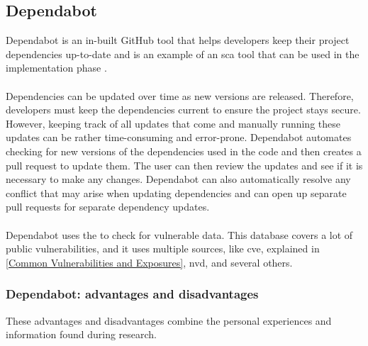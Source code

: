 \subsection{Dependabot}
Dependabot is an in-built GitHub tool that helps developers keep their project dependencies up-to-date and is an example of an \acrshort{sca} tool that can be used in the implementation phase \cite{GithubDependabot1}.
\\~\\
Dependencies can be updated over time as new versions are released. Therefore, developers must keep the dependencies current to ensure the project stays secure. However, keeping track of all updates that come and manually running these updates can be rather time-consuming and error-prone. Dependabot automates checking for new versions of the dependencies used in the code and then creates a pull request to update them. The user can then review the updates and see if it is necessary to make any changes. 
Dependabot can also automatically resolve any conflict that may arise when updating dependencies and can open up separate pull requests for separate dependency updates. 
\\~\\
Dependabot uses the  to check for vulnerable data. This database covers a lot of public vulnerabilities, and it uses multiple sources, like \acrlong{cve}, explained in \ref{Common Vulnerabilities and Exposures}, \acrlong{nvd}, and several others. \cite{GithubDependabot2}


\subsubsection{Dependabot: advantages and disadvantages}
These advantages and disadvantages combine the personal experiences and information found during research. \cite{prosconsdependabot} 

